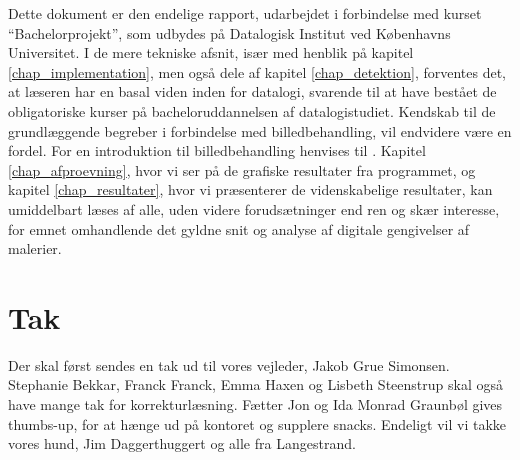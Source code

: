 {
{\sffamily Dette dokument er den endelige rapport, udarbejdet i
forbindelse med kurset ``Bachelorprojekt'', som udbydes på Datalogisk
Institut ved Københavns Universitet. I de mere tekniske afsnit, især med
henblik på kapitel \ref{chap_implementation}, men også dele af kapitel
\ref{chap_detektion}, forventes det, at læseren har en basal viden inden
for datalogi, svarende til at have bestået de obligatoriske kurser på
bacheloruddannelsen af datalogistudiet\cite{DIKUkurser}. Kendskab til de
grundlæggende begreber i forbindelse med billedbehandling, vil endvidere
være en fordel. For en introduktion til billedbehandling henvises til
\cite{SIOlsen}. Kapitel \ref{chap_afproevning}, hvor vi ser på de
grafiske resultater fra programmet, og kapitel \ref{chap_resultater},
hvor vi præsenterer de videnskabelige resultater, kan umiddelbart læses
af alle, uden videre forudsætninger end ren og skær interesse, for emnet
omhandlende det gyldne snit og analyse af digitale gengivelser af
malerier.

\section*{Tak}
Der skal først sendes en tak ud til vores vejleder, Jakob Grue Simonsen.
Stephanie Bekkar, Franck Franck, Emma Haxen og Lisbeth Steenstrup skal
også have mange tak for korrekturlæsning. Fætter Jon og Ida Monrad
Graunbøl gives thumbs-up, for at hænge ud på kontoret og supplere
snacks. Endeligt vil vi takke vores hund, Jim Daggerthuggert og alle fra
Langestrand.

}
}

